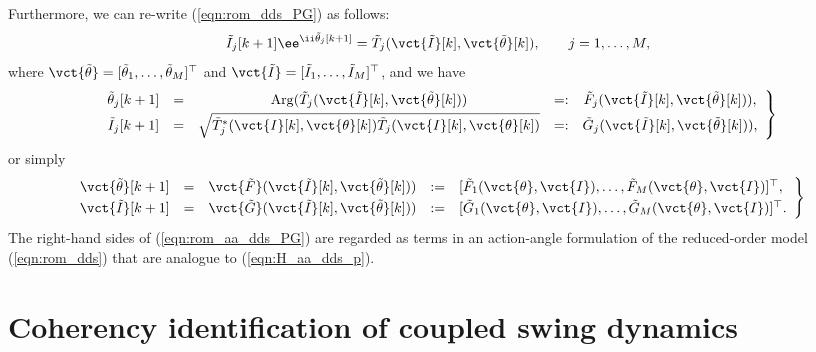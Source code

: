 \documentclass[a4paper,10pt]{article}
\begin{document}
Furthermore, we can re-write (\ref{eqn:rom_dds_PG}) as follows:
\[
\tilde{I}_j[k+1]\ee^{\ii\tilde{\theta}_j[k+1]}=\tilde{T}_j(\vct{\tilde{I}}[k],\vct{\tilde{\theta}}[k]),\makebox[2em]{}
j=1,\ldots,M,
\]
where $\vct{\tilde{\theta}}=[\tilde{\theta}_1,\ldots,\tilde{\theta}_M]^\top$ and $\vct{\tilde{I}}=[\tilde{I}_1,\ldots,\tilde{I}_M]^\top$, and we have
\begin{equation}
\left.
\begin{array}{ccccc}
\tilde{\theta}_j[k+1] &=& \mathrm{Arg}(\tilde{T}_j(\vct{\tilde{I}}[k],\vct{\tilde{\theta}}[k])) 
&=:& \tilde{F}_j(\vct{\tilde{I}}[k],\vct{\tilde{\theta}}[k])),
\\\noalign{\vskip 1mm}
\tilde{I}_j[k+1] &=& \sqrt{\tilde{T}^\ast_j(\vct{I}[k],\vct{\theta}[k])\tilde{T}_j(\vct{I}[k],\vct{\theta}[k])}
&=:& \tilde{G}_j(\vct{\tilde{I}}[k],\vct{\tilde{\theta}}[k])),
\end{array}
\right\}
\label{eqn:rom_aa_dds_PG}
\end{equation}
or simply
\begin{equation}
\left.
\begin{array}{ccccl}
\vct{\tilde{\theta}}[k+1] &=& \vct{\tilde{F}}(\vct{\tilde{I}}[k],\vct{\tilde{\theta}}[k])) 
&:=& [\tilde{F}_1(\vct{\theta},\vct{I}),\ldots,\tilde{F}_M(\vct{\theta},\vct{I})]^\top,
\\\noalign{\vskip 1mm}
\vct{\tilde{I}}[k+1] &=& \vct{\tilde{G}}(\vct{\tilde{I}}[k],\vct{\tilde{\theta}}[k])) 
&:=& [\tilde{G}_1(\vct{\theta},\vct{I}),\ldots,\tilde{G}_M(\vct{\theta},\vct{I})]^\top.
\end{array}
\right\}
\label{eqn:rom_aa_dds_PG2}
\end{equation}
The right-hand sides of (\ref{eqn:rom_aa_dds_PG}) are regarded as terms in an action-angle formulation of the reduced-order model (\ref{eqn:rom_dds}) that are analogue to (\ref{eqn:H_aa_dds_p}).  


\section{Coherency identification of coupled swing dynamics}
\label{sec:coherency}
\end{document}
